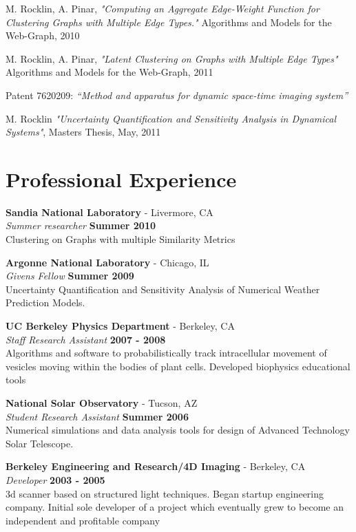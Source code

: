 \documentclass[margin,line]{res}
\begin{document}
\begin{resume}
M. Rocklin, A. Pinar, \textit{"Computing an Aggregate Edge-Weight Function for Clustering Graphs with Multiple Edge Types."} Algorithms and Models for the Web-Graph, 2010

M. Rocklin, A. Pinar, \textit{"Latent Clustering on Graphs with Multiple Edge Types"} Algorithms and Models for the Web-Graph, 2011

Patent 7620209: \textit{“Method and apparatus for dynamic space-time imaging system”}

M. Rocklin \textit{"Uncertainty Quantification and Sensitivity Analysis in Dynamical Systems"}, Masters Thesis, May, 2011

\section{\sc Professional Experience}

{\bf Sandia National Laboratory } - Livermore, CA\\
{\em Summer researcher} \hfill {\bf Summer 2010}\\
Clustering on Graphs with multiple Similarity Metrics 

{\bf Argonne National Laboratory} - Chicago, IL\\
{\em Givens Fellow} \hfill {\bf Summer 2009}\\
Uncertainty Quantification and Sensitivity Analysis of Numerical Weather Prediction Models.

{\bf UC Berkeley Physics Department} - Berkeley, CA\\
{\em Staff Research Assistant} \hfill {\bf 2007 - 2008}\\
Algorithms and software to probabilistically track intracellular movement of vesicles moving within the bodies of plant cells. Developed biophysics educational tools

{\bf National Solar Observatory} - Tucson, AZ\\
{\em Student Research Assistant} \hfill {\bf Summer 2006}\\
Numerical simulations and data analysis tools for design of Advanced Technology Solar Telescope.

{\bf Berkeley Engineering and Research/4D Imaging} - Berkeley, CA\\
{\em Developer} \hfill {\bf 2003 - 2005}\\
3d scanner based on structured light techniques. Began startup engineering company. Initial sole developer of a project which eventually grew to become an independent and profitable company


\end{resume}
\end{document}
